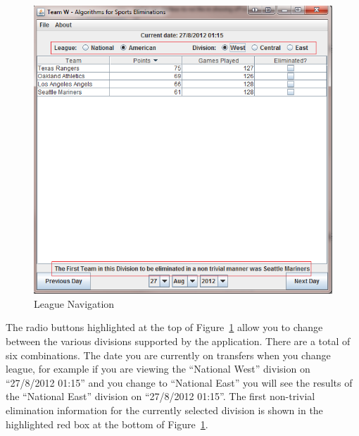 \begin{figure}
  \includegraphics[width=\linewidth,keepaspectratio]{images/userManualDesk3.png}
  \caption{League Navigation}\label{fig:LEAGNAV}
\end{figure}
The radio buttons highlighted at the top of Figure~\ref{fig:LEAGNAV}
allow you to change between the various divisions supported by the
application. There are a total of six combinations. The date you
are currently on transfers when you change league, for example if you
are viewing the ``National West'' division on ``27/8/2012 01:15'' and
you change to ``National East'' you will see the results of the
``National East'' division on ``27/8/2012 01:15''. The first
non-trivial elimination information for the currently selected
division is shown in the highlighted red box at the bottom of
Figure~\ref{fig:LEAGNAV}.

